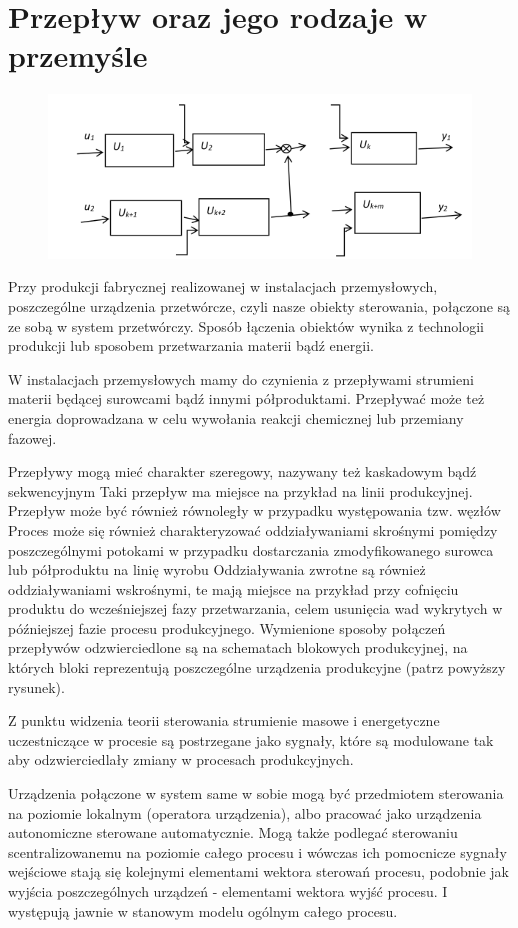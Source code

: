 \documentclass{article}
\begin{document}
	\section{Przepływ oraz jego rodzaje w przemyśle}
		\begin{figure}
			\includegraphics[height=0.3\textwidth]{PoziomSystemowy.png}
		\end{figure}
		Przy produkcji fabrycznej realizowanej w instalacjach przemysłowych, poszczególne
		urządzenia przetwórcze, czyli nasze obiekty sterowania, połączone są ze sobą
		w system przetwórczy.
		Sposób łączenia obiektów wynika z technologii produkcji lub sposobem przetwarzania
		materii bądź energii.

		W instalacjach przemysłowych mamy do czynienia z przepływami strumieni materii
		będącej surowcami bądź innymi półproduktami.
		Przepływać może też energia doprowadzana w celu wywołania reakcji chemicznej lub
		przemiany fazowej.

		Przepływy mogą mieć charakter szeregowy, nazywany też kaskadowym bądź sekwencyjnym
		Taki przepływ ma miejsce na przykład na linii produkcyjnej.
		Przepływ może być również równoległy w przypadku występowania tzw. węzłów
		Proces może się
		również charakteryzować oddziaływaniami skrośnymi pomiędzy poszczególnymi
		potokami w przypadku dostarczania zmodyfikowanego surowca lub półproduktu na linię
		wyrobu 
		Oddziaływania zwrotne są również oddziaływaniami wskrośnymi, te mają miejsce 
		na przykład przy cofnięciu
		produktu do wcześniejszej fazy przetwarzania, celem usunięcia
		wad wykrytych w późniejszej fazie procesu produkcyjnego.
		Wymienione sposoby połączeń przepływów odzwierciedlone są na schematach blokowych produkcyjnej, na których
		bloki reprezentują poszczególne urządzenia produkcyjne (patrz powyższy rysunek).

		Z punktu widzenia teorii sterowania strumienie masowe i energetyczne uczestniczące
		w procesie są postrzegane jako sygnały, które są modulowane tak aby odzwierciedlały
		zmiany w procesach produkcyjnych.

		Urządzenia połączone w system same w sobie mogą być przedmiotem sterowania na
		poziomie lokalnym (operatora urządzenia), albo pracować jako urządzenia
		autonomiczne sterowane automatycznie. Mogą także
		podlegać sterowaniu scentralizowanemu na poziomie całego procesu i wówczas ich
		pomocnicze sygnały wejściowe
		stają się kolejnymi elementami wektora sterowań procesu, podobnie jak wyjścia
		poszczególnych urządzeń - elementami wektora wyjść procesu. I występują jawnie w
		stanowym modelu ogólnym całego procesu.
\end{document}
